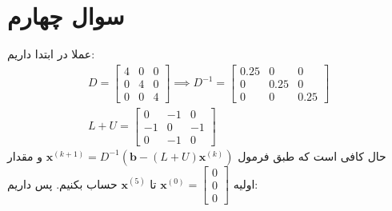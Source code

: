 \documentclass[]{article}
\begin{document}
\section*{سوال چهارم}
عملا در ابتدا داریم:
\begin{gather*}
    D = \begin{bmatrix}
        4 & 0 & 0\\
        0 & 4 & 0\\
        0 & 0 & 4
    \end{bmatrix}
    \implies
    D^{-1} = \begin{bmatrix}
        0.25 & 0 & 0\\
        0 & 0.25 & 0\\
        0 & 0 & 0.25
    \end{bmatrix}\\
    L + U = \begin{bmatrix}
        0 & -1 & 0\\
        -1 & 0 & -1\\
        0 & -1 & 0
    \end{bmatrix}
\end{gather*}
حال کافی است که طبق فرمول
$\mathbf{x}^{(k+1)} = D^{-1} (\mathbf{b} - (L+U) \mathbf{x}^{(k)})$
و مقدار اولیه
$\mathbf{x}^{(0)} = \begin{bmatrix}
    0\\
    0\\
    0 
\end{bmatrix}$
تا
$\mathbf{x}^{(5)}$
حساب بکنیم. پس داریم:
\end{document}
